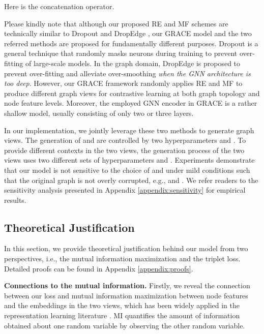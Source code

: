 \documentclass{article}
\theoremstyle{remark}
\begin{document}
Here  is the concatenation operator.

Please kindly note that although our proposed RE and MF schemes are technically similar to Dropout \cite{Srivastava:2014cg} and DropEdge \cite{Rong:2020vx}, our GRACE model and the two referred methods are proposed for fundamentally different purposes. Dropout is a general technique that randomly masks neurons during training to prevent over-fitting of large-scale models. In the graph domain, DropEdge is proposed to prevent over-fitting and alleviate over-smoothing \emph{when the GNN architecture is too deep}. However, our GRACE framework randomly applies RE and MF to produce different graph views for contrastive learning at both graph topology and node feature levels. Moreover, the employed GNN encoder in GRACE is a rather shallow model, usually consisting of only two or three layers.



In our implementation, we jointly leverage these two methods to generate graph views.
The generation of  and  are controlled by two hyperparameters  and . 
To provide different contexts in the two views, the generation process of the two views uses two different sets of hyperparameters  and .
Experiments demonstrate that our model is not sensitive to the choice of  and  under mild conditions such that the original graph is not overly corrupted, e.g.,  and . We refer readers to the sensitivity analysis presented in Appendix \ref{appendix:sensitivity} for empirical results.

\subsection{Theoretical Justification}

In this section, we provide theoretical justification behind our model from two perspectives, i.e., the mutual information maximization and the triplet loss. Detailed proofs can be found in Appendix \ref{appendix:proofs}.

\textbf{Connections to the mutual information.\quad}
Firstly, we reveal the connection between our loss and mutual information maximization between node features and the embeddings in the two views, which has been widely applied in the representation learning literature \cite{Tian:2019vw,Bachman:2019wp,Poole:2019vk,Tschannen:2020uo}. MI quantifies the amount of information obtained about one random variable by observing the other random variable.
\end{document}
